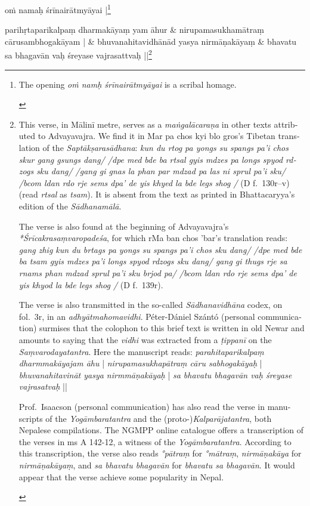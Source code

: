 \documentclass[naipra.tex]{subfiles}
\begin{document}
\beginnumbering
\begin{sanskrit}
\pstart\noindent
{}oṁ namaḥ śrīnairātmyāyai |\footnote{
	\begin{english}%
		The opening \emph{oṁ namḥ śrīnairātmyāyai} is a scribal homage.
	\end{english}
}
\pend

\medskip\versequote
parihṛtaparikalpaṃ dharmakāyaṃ yam āhur &
\hspace{20pt}nirupamasukhamātraṃ cārusambhogakāyam | \&
\versequote
bhuvanahitavidhānād yasya nirmāṇakāyaṃ &
\hspace{20pt}bhavatu sa bhagavān vaḥ śreyase vajrasattvaḥ ||\footnote{
	\begin{english}%
		This verse, in Mālinī metre, serves as a \emph{maṅgalācaraṇa} in other texts attributed to Advayavajra.
		We find it in Mar pa chos kyi blo gros's Tibetan translation of the \emph{Saptākṣarasādhana}: \emph{kun du rtog pa yongs su spangs pa'i chos skur gang gsungs dang/ /dpe med bde ba rtsal gyis mdzes pa longs spyod rdzogs sku dang/ /gang gi gnas la phan par mdzad pa las ni sprul pa'i sku/ /bcom ldan rdo rje sems dpa' de yis khyed la bde legs shog /} (D f.\ 130r–v) (read \emph{rtsal} as \emph{tsam}).
		It is absent from the text as printed in Bhattacaryya's edition of the \emph{Sādhanamālā}.

		The verse is also found at the beginning of Advayavajra's \emph{*Śrīcakrasaṃvaropadeśa}, for which rMa ban chos 'bar's translation reads: \emph{gang zhig kun du brtags pa yongs su spangs pa'i chos sku dang/ /dpe med bde ba tsam gyis mdzes pa'i longs spyod rdzogs sku dang/ gang gi thugs rje sa rnams phan mdzad sprul pa'i sku brjod pa/ /bcom ldan rdo rje sems dpa' de yis khyod la bde legs shog /} (D f.\ 139r).

		The verse is also transmitted in the so-called \emph{Sādhanavidhāna} codex, on fol.\ 3r, in an \emph{adhyātmahomavidhi}.
		Péter-Dániel Szántó (personal communication) surmises that the colophon to this brief text is written in old Newar and amounts to saying that the \emph{vidhi} was extracted from a \emph{ṭippanī} on the \emph{Saṃvarodayatantra}. 
		Here the manuscript reads: \emph{parahitaparikalpaṃ dharmmakāyajam āhu} | \emph{nirupamasukhapātraṃ cāru sabhogakāyaḥ} | \emph{bhuvanahitavināt yasya nirmmāṇakāyaḥ} | \emph{sa bhavatu bhagavān vaḥ śreyase vajrasatvaḥ} ||

		Prof.\ Isaacson (personal communication) has also read the verse in manuscripts of the \emph{Yogāmbaratantra} and the (proto-)\emph{Kalparājatantra}, both Nepalese compilations.
		The NGMPP online catalogue offers a transcription of the verses in ms A 142-12, a witness of the \emph{Yogāmbaratantra}.
		According to this transcription, the verse also reads \emph{°pātraṃ} for \emph{°mātraṃ}, \emph{nirmāṇakāya} for \emph{nirmāṇakāyaṃ}, and \emph{sa bhavatu bhagavān} for \emph{bhavatu sa bhagavān}.
		It would appear that the verse achieve some popularity in Nepal.


\end{english}}
\end{sanskrit}
\end{document}
